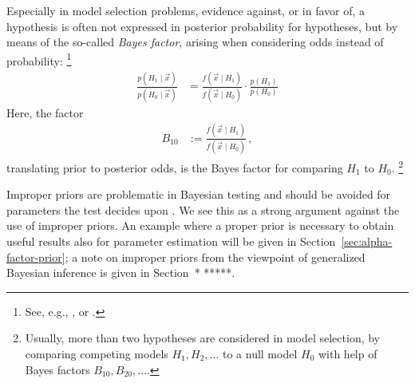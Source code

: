 Especially in model selection problems, evidence against, or in favor of, a hypothesis
is often not expressed in posterior probability for hypotheses, but by means of the so-called \emph{Bayes factor},
arising when considering odds instead of probability:%
\footnote{See, e.g., \textcite[\S 5.2.2, Def.~5.2.5, p.~227]{2007:robert}, or \textcite[p.~776]{1995:kass-raftery}.}
\begin{align*}
\frac{p(H_1\mid\vec{x})}{p(H_0\mid\vec{x})} &= \frac{f(\vec{x}\mid H_1)}{f(\vec{x}\mid H_0)} \cdot \frac{p(H_1)}{p(H_0)}
\end{align*}
Here, the factor
\begin{align*}
B_{10} &:= \frac{f(\vec{x}\mid H_1)}{f(\vec{x}\mid H_0)}\,,
\end{align*}
translating prior to posterior odds, is the Bayes factor for comparing $H_1$ to $H_0$.%
\footnote{Usually, more than two hypotheses are considered in model selection,
by comparing competing models $H_1, H_2, \ldots$ to a null model $H_0$
with help of Bayes factors $B_{10}, B_{20}, \ldots$.}

Improper priors are problematic in Bayesian testing \parencite[\S 5.2.5]{2007:robert}
and should be avoided for parameters the test decides upon \parencite[p.~782]{1995:kass-raftery}.
We see this as a strong argument against the use of improper priors.
An example where a proper prior is necessary to obtain useful results also for parameter estimation
will be given in Section~\ref{sec:alpha-factor-prior};
a note on improper priors from the viewpoint of generalized Bayesian inference is given in Section~* *****.
\iffalse
\cite[p.~235f]{2007:robert}
\begin{quote}
The difficulties encountered with noninformative priors in testing
also point out that a testing problem cannot be treated in a coherent way if no prior information is available,
that is, that the information brought by the observations alone is usually not enough
to infer about the truth of a hypothesis in categorical fashion (\emph{yes}/\emph{no}).
This obviously reinforces the the motivation for a Bayesian treatment of such testing problems,
since it is the only coherent approach taking advantage of the residual information.
\end{quote}
\fi




